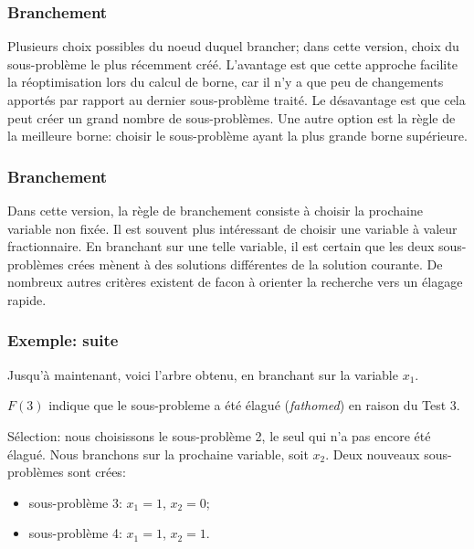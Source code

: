 \documentclass[usepdftitle=false]{beamer}
\begin{document}
\begin{frame}
\frametitle{Branchement}

Plusieurs choix possibles du noeud duquel brancher; dans cette version, choix du sous-problème le plus récemment créé.
L'avantage est que cette approche facilite la réoptimisation lors du calcul de borne, car il n'y a que peu de changements apportés par rapport au dernier sous-problème traité.
Le désavantage est que cela peut créer un grand nombre de sous-problèmes.
Une autre option est la règle de la meilleure borne: choisir le sous-problème ayant la plus grande borne supérieure.

\end{frame}

\begin{frame}
\frametitle{Branchement}

Dans cette version, la règle de branchement consiste à choisir la prochaine variable non fixée. Il est souvent plus intéressant de choisir une variable à valeur fractionnaire.
En branchant sur une telle variable, il est certain que les deux sous-problèmes crées mènent à des solutions différentes de la solution courante.
De nombreux autres critères existent de facon à orienter la recherche vers un élagage rapide.

\end{frame}

\begin{frame}
\frametitle{Exemple: suite}

Jusqu'à maintenant, voici l'arbre obtenu, en branchant sur la variable $x_1$.
\begin{center}
\end{center}
$F(3)$ indique que le sous-probleme a été élagué ({\sl fathomed}) en raison du Test 3.

\mbox{}

Sélection: nous choisissons le sous-problème 2, le seul qui n'a pas encore été élagué.
Nous branchons sur la prochaine variable, soit $x_2$.
Deux nouveaux sous-problèmes sont crées:
\begin{itemize}
\item
sous-problème 3: $x_1 = 1$, $x_2 = 0$;
\item
sous-problème 4: $x_1 = 1$, $x_2 = 1$.
\end{itemize}

\end{frame}
\end{document}
